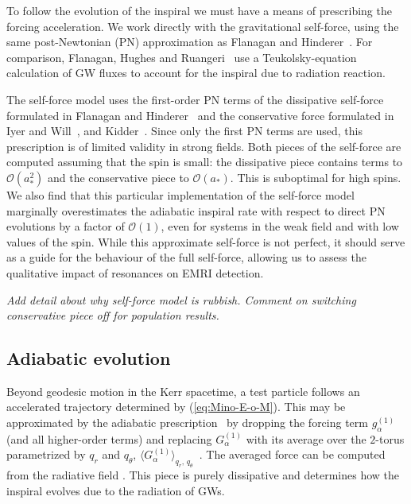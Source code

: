 \documentclass[aps,prd,amsfonts,amssymb,amsmath,nofootinbib,showpacs,superscriptaddress,twocolumn]{revtex4}
\newcommand{\eqnref}[1]{(\ref{eq:#1})}
\newcommand{\order}[1]{\ensuremath{\mathcal{O}({#1})}}
\begin{document}
To follow the evolution of the inspiral we must have a means of prescribing the forcing acceleration. We work directly with the gravitational self-force, using the same post-Newtonian (PN) approximation as Flanagan and Hinderer~\cite{Flanagan2012}. For comparison, Flanagan, Hughes and Ruangeri~\cite{Flanagan2012a} use a Teukolsky-equation calculation of GW fluxes to account for the inspiral due to radiation reaction.

The self-force model uses the first-order PN terms of the dissipative self-force formulated in Flanagan and Hinderer~\cite{Flanagan2007} and the conservative force formulated in Iyer and Will~\cite{Iyer1993}, and Kidder~\cite{Kidder1995}. Since only the first PN terms are used, this prescription is of limited validity in strong fields. Both pieces of the self-force are computed assuming that the spin is small: the dissipative piece contains terms to $\order{a_\ast^2}$ and the conservative piece to $\order{a_\ast}$. This is suboptimal for high spins. We also find that this particular implementation of the self-force model marginally overestimates the adiabatic inspiral rate with respect to direct PN evolutions by a factor of $\mathcal{O}(1)$, even for systems in the weak field and with low values of the spin. While this approximate self-force is not perfect, it should serve as a guide for the behaviour of the full self-force, allowing us to assess the qualitative impact of resonances on EMRI detection.

\emph{Add detail about why self-force model is rubbish. Comment on switching conservative piece off for population results.}

\subsection{Adiabatic evolution}
\label{sec:adiabatic}

Beyond geodesic motion in the Kerr spacetime, a test particle follows an accelerated trajectory determined by \eqnref{Mino-E-o-M}. This may be approximated by the adiabatic prescription~\cite{Hinderer2008} by dropping the forcing term $g_\alpha^{(1)}$ (and all higher-order terms) and replacing $G_\alpha^{(1)}$ with its average over the $2$-torus parametrized by $q_r$ and $q_\theta$, $\langle G_\alpha^{(1)}\rangle_{q_r,\,q_\theta}$~\cite{Drasco2005}. The averaged force can be computed from the radiative field \cite{Galtsov1982,Mino2003,Sago2006,Ganz2007}. This piece is purely dissipative and determines how the inspiral evolves due to the radiation of GWs.
\end{document}
